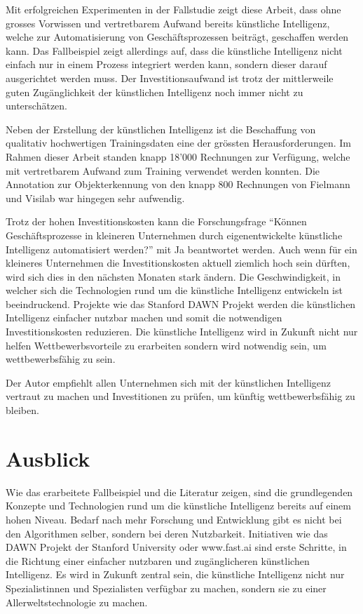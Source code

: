 Mit erfolgreichen Experimenten in der Fallstudie zeigt diese Arbeit, dass ohne grosses Vorwissen und vertretbarem Aufwand bereits künstliche Intelligenz, welche zur Automatisierung von Geschäftsprozessen beiträgt, geschaffen werden kann. Das Fallbeispiel zeigt allerdings auf, dass die künstliche Intelligenz nicht einfach nur in einem Prozess integriert werden kann, sondern dieser darauf ausgerichtet werden muss. Der Investitionsaufwand ist trotz der mittlerweile guten Zugänglichkeit der künstlichen Intelligenz noch immer nicht zu unterschätzen.

Neben der Erstellung der künstlichen Intelligenz ist die Beschaffung von qualitativ hochwertigen Trainingsdaten eine der grössten Herausforderungen. Im Rahmen dieser Arbeit standen knapp 18'000 Rechnungen zur Verfügung, welche mit vertretbarem Aufwand zum Training verwendet werden konnten. Die Annotation zur Objekterkennung von den knapp 800 Rechnungen von Fielmann und Visilab war hingegen sehr aufwendig. 

Trotz der hohen Investitionskosten kann die Forschungsfrage \enquote{Können Geschäftsprozesse in kleineren Unternehmen durch eigenentwickelte künstliche Intelligenz automatisiert werden?} mit Ja beantwortet werden. Auch wenn für ein kleineres Unternehmen die Investitionskosten aktuell ziemlich hoch sein dürften, wird sich dies in den nächsten Monaten stark ändern. Die Geschwindigkeit, in welcher sich die Technologien rund um die künstliche Intelligenz entwickeln ist beeindruckend. Projekte wie das Stanford DAWN Projekt werden die künstlichen Intelligenz einfacher nutzbar machen und somit die notwendigen Investitionskosten reduzieren. Die künstliche Intelligenz wird in Zukunft nicht nur helfen Wettbewerbsvorteile zu erarbeiten sondern wird notwendig sein, um wettbewerbsfähig zu sein.

Der Autor empfiehlt allen Unternehmen sich mit der künstlichen Intelligenz vertraut zu machen und Investitionen zu prüfen, um künftig wettbewerbsfähig zu bleiben. 

\section{Ausblick}
\label{chap:ausblick}

Wie das erarbeitete Fallbeispiel und die Literatur zeigen, sind die grundlegenden Konzepte und Technologien rund um die künstliche Intelligenz bereits auf einem hohen Niveau. Bedarf nach mehr Forschung und Entwicklung gibt es nicht bei den Algorithmen selber, sondern bei deren Nutzbarkeit. Initiativen wie das DAWN Projekt der Stanford University oder www.fast.ai sind erste Schritte, in die Richtung einer einfacher nutzbaren und zugänglicheren künstlichen Intelligenz. Es wird in Zukunft zentral sein, die künstliche Intelligenz nicht nur Spezialistinnen und Spezialisten verfügbar zu machen, sondern sie zu einer Allerweltstechnologie zu machen. 

